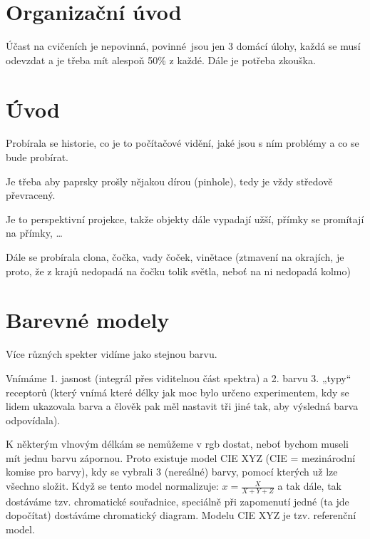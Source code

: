 \documentclass[12pt]{article}					%
\begin{document}

\section*{Organizační úvod}
\begin{poznamka}
	Účast na cvičeních je nepovinná, povinné jsou jen 3 domácí úlohy, každá se musí odevzdat a je třeba mít alespoň 50\% z každé. Dále je potřeba zkouška.
\end{poznamka}

\section{Úvod}
\begin{poznamka}
	Probírala se historie, co je to počítačové vidění, jaké jsou s ním problémy a co se bude probírat.
\end{poznamka}


\begin{definice}
	Je třeba aby paprsky prošly nějakou dírou (pinhole), tedy je vždy středově převracený.

	Je to perspektivní projekce, takže objekty dále vypadají užší, přímky se promítají na přímky, …
\end{definice}

\begin{poznamka}
	Dále se probírala clona, čočka, vady čoček, vinětace (ztmavení na okrajích, je proto, že z krajů nedopadá na čočku tolik světla, neboť na ni nedopadá kolmo)
\end{poznamka}


\section{Barevné modely}
\begin{definice}[Metamerism]
	Více různých spekter vidíme jako stejnou barvu.
\end{definice}

\begin{definice}
	Vnímáme 1. jasnost (integrál přes viditelnou část spektra) a 2. barvu 3. „typy“ receptorů (který vnímá které délky jak moc bylo určeno experimentem, kdy se lidem ukazovala barva a člověk pak měl nastavit tři jiné tak, aby výsledná barva odpovídala).

	K některým vlnovým délkám se nemůžeme v rgb dostat, neboť bychom museli mít jednu barvu zápornou. Proto existuje model CIE XYZ (CIE = mezinárodní komise pro barvy), kdy se vybrali 3 (nereálné) barvy, pomocí kterých už lze všechno složit. Když se tento model normalizuje: $x = \frac{X}{X + Y + Z}$ a tak dále, tak dostáváme tzv. chromatické souřadnice, speciálně při zapomenutí jedné (ta jde dopočítat) dostáváme chromatický diagram. Modelu CIE XYZ je tzv. referenční model.
\end{definice}
\end{document}
